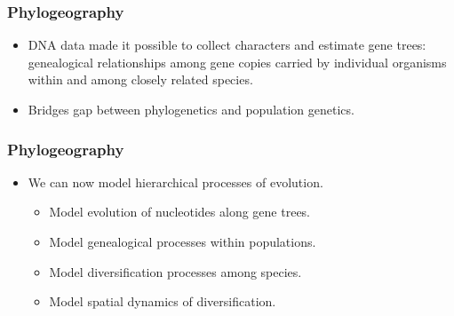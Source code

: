 \begin{frame}
    \frametitle{Phylogeography}
    \begin{itemize}
        \item DNA data made it possible to collect characters and estimate gene
            trees: genealogical relationships among gene copies carried by
            individual organisms within and among closely related species.
        \item Bridges gap between phylogenetics and population genetics.
    \end{itemize}
\end{frame}

\begin{frame}
    \frametitle{Phylogeography}
    \begin{itemize}
        \item We can now model hierarchical processes of evolution.
        \begin{itemize}
            \item Model evolution of nucleotides along gene trees.
            \item Model genealogical processes within populations.
            \item Model diversification processes among species.
            \item Model spatial dynamics of diversification.
        \end{itemize}
    \end{itemize}
\end{frame}


